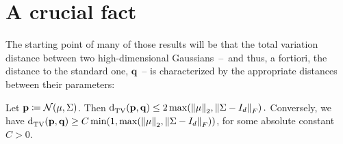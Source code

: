 \documentclass[10pt]{article}
\newcommand{\dims}{d}
\newcommand{\p}{\mathbf{p}}
\newcommand{\q}{\mathbf{q}}
\renewcommand{\eqdef}{\coloneqq}
\theoremstyle{plain}
\begin{document}
\section{A crucial fact}
The starting point of many of those results will be that the total variation distance between two high-dimensional Gaussians~--~and thus, a fortiori, the distance to the standard one, $\q$~-- is characterized by the appropriate distances between their parameters:
\begin{fact}
  \label{fact:tv:parameters}
  Let $\p\eqdef\gaussian{\mu}{\Sigma}$. Then
  $
      \totalvardist{\p}{\q} \leq 2\max\mleft(  \normtwo{\mu}, \norm{\Sigma-I_\dims}_F \mright)\,.
  $
  Conversely, we have $\totalvardist{\p}{\q} \geq C\min(1,\max\mleft(  \normtwo{\mu}, \norm{\Sigma-I_\dims}_F \mright))$, for some absolute constant $C>0$.
\end{fact}
\end{document}
